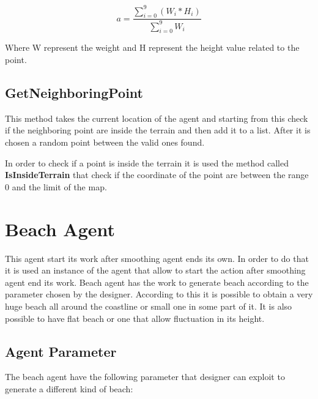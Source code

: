 \documentclass[12pt]{article}
\begin{document}
    \begin{equation}
        a = \dfrac{\sum\limits_{i=0}^{9} (W_i * H_i) }{ \sum\limits_{i=0}^{9} W_i }
    \end{equation}

    \noindent
    Where W represent the weight and H represent the height value related to the point. 

    \subsection{GetNeighboringPoint}
    This method takes the current location of the agent and starting from this check if the neighboring point are inside the terrain and then add it to a list. After it is chosen a 
    random point between the valid ones found.

    In order to check if a point is inside the terrain it is used the method called \textbf{IsInsideTerrain} that check if the coordinate of the point are between the range 0 and
    the limit of the map.

    \section{Beach Agent}
    This agent start its work after smoothing agent ends its own. In order to do that it is used an instance of the agent that allow to start the action after smoothing agent end its work.
    Beach agent has the work to generate beach according to the parameter chosen by the designer.
    According to this it is possible to obtain a very huge beach all around the coastline or small one in some part of it. It is also possible
    to have flat beach or one that allow fluctuation in its height.

    \subsection{Agent Parameter}
    The beach agent have the following parameter that designer can exploit to generate a different kind of beach:
\end{document}
